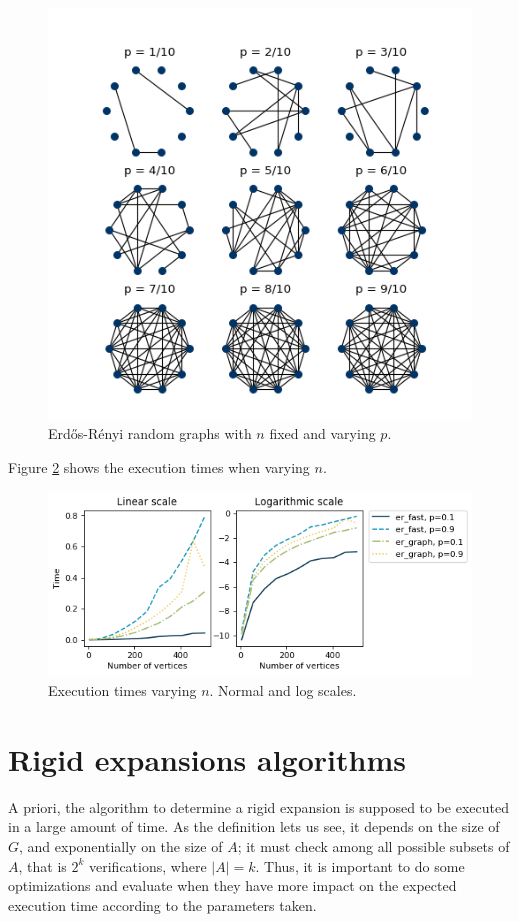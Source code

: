 \begin{figure}[h]
	\centering
	\includegraphics[scale=0.85]{Figures/ER-10.png}
	\caption{Erdős-Rényi random graphs with $n$ fixed and varying $p$.}
	\label{fig:ErdosRenyi10}
\end{figure}

Figure \ref{fig:tiemposER} shows the execution times when varying $n$.
\begin{figure}[h!]
	\centering
	\includegraphics[scale=0.7]{Python/Figures/Time-execution-er-generation-algoriths.png}
	\caption{Execution times varying $n$. Normal and log scales.}
	\label{fig:tiemposER}
\end{figure}

\section{Rigid expansions algorithms}
A priori, the algorithm to determine a rigid expansion is supposed to be executed in a large amount of time. As the definition lets us see, it depends on the size of $G$, and exponentially on the size of $A$; it must check among all possible subsets of $A$, that is $2^{k}$ verifications, where $|A|=k$. Thus, it is important to do some optimizations and evaluate when they have more impact on the expected execution time according to the parameters taken.

